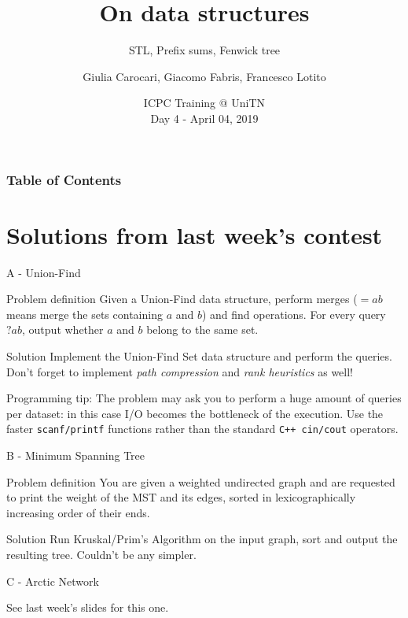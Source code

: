 \documentclass{beamer}
\title{On data structures}
\subtitle{STL, Prefix sums, Fenwick tree}
\author[Carocari, Fabris, Lotito]
{Giulia Carocari, Giacomo Fabris, Francesco Lotito}
\institute[UniTN]{Università degli Studi di Trento}
\date[April 04, 2019]
{ICPC Training @ UniTN\\ Day 4 - April 04, 2019}
\begin{document}
 
  \frame{\titlepage}
  \begin{frame} 
      \frametitle{Table of Contents}
      \tableofcontents
  \end{frame}

\section{Solutions from last week's contest}
\begin{frame}{A - Union-Find}
\begin{block}{Problem definition}
    Given a Union-Find data structure, perform merges ($= a b$ means merge the sets containing $a$ and $b$) and find operations.
    For every query $? a b$, output whether $a$ and $b$ belong to the same set.
\end{block}
\pause
{}
\begin{block}{Solution}
  Implement the Union-Find Set data structure and perform the queries. Don't forget to implement 
  \textit{path compression} and \textit{rank heuristics} as well!
\end{block}
\alert{Programming tip:}
  The problem may ask you to perform a huge amount of queries per dataset: in this case I/O becomes
  the bottleneck of the execution. Use the faster \texttt{scanf/printf} functions rather than
  the standard \texttt{C++ cin/cout} operators.
\end{frame}

\begin{frame}{B - Minimum Spanning Tree}
  \begin{block}{Problem definition}
    You are given a weighted undirected graph and are requested to print the weight of the MST and
    its edges, sorted in lexicographically increasing order of their ends.
  \end{block}
  \pause
  \begin{block}{Solution}
    Run Kruskal/Prim's Algorithm on the input graph, sort and output the resulting tree.
    Couldn't be any simpler.
  \end{block}
\end{frame}

\begin{frame}{C - Arctic Network}
  \begin{huge}
    \begin{center}
      See last week's slides for this one.
    \end{center}
  \end{huge}
\end{frame}
\end{document}
